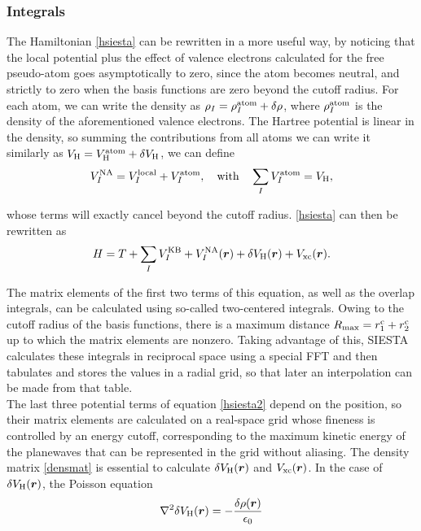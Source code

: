 
\subsubsection*{Integrals}
 The Hamiltonian \ref{hsiesta} can be rewritten in a more useful way, by noticing that the local potential plus the effect of valence electrons calculated for the free pseudo-atom goes asymptotically to zero, since the atom becomes neutral, and strictly to zero when the basis functions are zero beyond the cutoff radius\parencite{Soler2002}. For each atom, we can write the density as  \(\rho_I=\rho_I^{\mathrm{atom}}+\delta\rho\), where \(\rho_I^{\mathrm{atom}}\) is the density of the aforementioned valence electrons. The Hartree potential is linear in the density, so summing the contributions from all atoms we can write it similarly as \(V_{\mathrm{H}}=V_{\mathrm{H}}^{\mathrm{atom}}+\delta V_{\mathrm{H}}\), we can define
 \begin{equation}
 V_I^{\mathrm{NA}}=V_I^{\mathrm{local}}+V_I^{\mathrm{atom}},\quad\mathrm{with}\quad\sum_IV_I^{\mathrm{atom}}=V_{\mathrm{H}},
 \end{equation}

whose terms will exactly cancel beyond the cutoff radius. \ref{hsiesta} can then be rewritten as
\begin{equation}
\label{hsiesta2}
H=T+\sum_{I}V_{I}^{\mathrm{KB}}+V_I^{\mathrm{NA}}(\bm{r})+\delta V_{\mathrm{H}}(\bm r)+V_{\mathrm{xc}}(\bm{r}).
\end{equation}

The matrix elements of the first two terms of this equation, as well as the overlap integrals, can be calculated using so-called two-centered integrals. Owing to the cutoff radius of the basis functions, there is a maximum distance \(R_{\mathrm{max}}=r_1^{\mathrm{c}}+r_2^{\mathrm{c}}\) up to which the matrix elements are nonzero. Taking advantage of this, SIESTA calculates these integrals in reciprocal space using a special FFT\parencite{Soler2002} and then tabulates and stores the values in a radial grid, so that later an interpolation can be made from that table.\\

The last three potential terms of equation \ref{hsiesta2} depend on the position, so their matrix elements are calculated on a real-space grid whose fineness is controlled by an energy cutoff, corresponding to the maximum kinetic energy of the planewaves that can be represented in the grid without aliasing\parencite{Soler2002}. The density matrix \ref{densmat} is essential to calculate \(\delta V_{\mathrm{H}}(\bm r)\) and \(V_{\mathrm{xc}}(\bm{r})\). In the case of \(\delta V_{\mathrm{H}}(\bm r)\), the Poisson equation
\begin{equation}
\nabla^{2} \delta V_{\mathrm{H}}(\bm{r})=-\frac{\delta \rho(\bm{r})}{\epsilon_{0}}
\end{equation}

